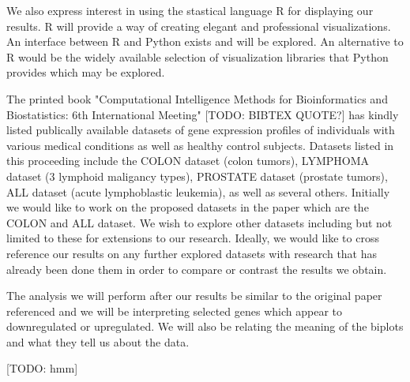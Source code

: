 \documentclass[10pt,a4,oneside]{report}
\begin{document}
We also express interest in using the stastical language R for displaying our results. R will provide a way of creating elegant and professional visualizations. An interface between R and Python exists and will be explored. An alternative to R would be the widely available selection of visualization libraries that Python provides which may be explored.

The printed book "Computational Intelligence Methods for Bioinformatics and Biostatistics: 6th International Meeting" [TODO: BIBTEX QUOTE?] has kindly listed publically available datasets of gene expression profiles of individuals with various medical conditions as well as healthy control subjects. Datasets listed in this proceeding include the COLON dataset (colon tumors), LYMPHOMA dataset (3 lymphoid maligancy types), PROSTATE dataset (prostate tumors), ALL dataset (acute lymphoblastic leukemia), as well as several others. Initially we would like to work on the proposed datasets in the paper which are the COLON and ALL dataset. We wish to explore other datasets including but not limited to these for extensions to our research. Ideally, we would like to cross reference our results on any further explored datasets with research that has already been done them in order to compare or contrast the results we obtain.

The analysis we will perform after our results be similar to the original paper referenced and we will be interpreting selected genes which appear to downregulated or upregulated. We will also be relating the meaning of the biplots and what they tell us about the data.

[TODO: hmm]
\end{document}
